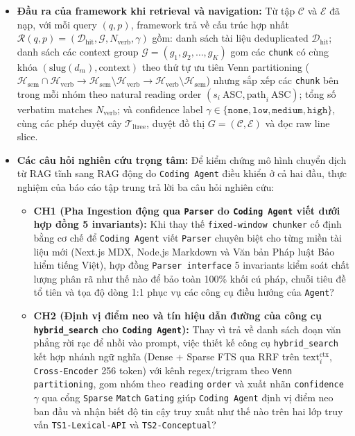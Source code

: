 \begin{itemize}
\begin{enumerate}
        \item \textit{Invariant citation grounding trên graph edge}: Mọi cạnh quan hệ $e = (c_u, c_v, r, \tau) \in \mathcal{E}$ phải thuộc tập 9 mã quan hệ chuẩn của hệ thống, thỏa mãn $c_u \neq c_v$ và chứa chuỗi trích dẫn $\tau \neq \emptyset$ xuất hiện nguyên văn trong $\text{text}^{\text{verb}}_u$ sau khi chuẩn hóa khoảng trắng.
    \end{enumerate}
    \item \textbf{Đầu ra của framework khi retrieval và navigation:}
    Từ tập $\mathcal{C}$ và $\mathcal{E}$ đã nạp, với mỗi query $(q, p)$, framework trả về cấu trúc hợp nhất $\mathcal{R}(q, p) = (\mathcal{D}_{\text{hit}}, \mathcal{G}, N_{\text{verb}}, \gamma)$ gồm: danh sách tài liệu deduplicated $\mathcal{D}_{\text{hit}}$; danh sách các context group $\mathcal{G} = (g_1, g_2, \dots, g_K)$ gom các \texttt{chunk} có cùng khóa $(\text{slug}(d_m), \text{context})$ theo thứ tự ưu tiên Venn partitioning ($\mathcal{H}_{\text{sem}} \cap \mathcal{H}_{\text{verb}} \rightarrow \mathcal{H}_{\text{sem}} \setminus \mathcal{H}_{\text{verb}} \rightarrow \mathcal{H}_{\text{verb}} \setminus \mathcal{H}_{\text{sem}}$) nhưng sắp xếp các \texttt{chunk} bên trong mỗi nhóm theo natural reading order $(s_i\ \text{ASC}, \text{path}_i\ \text{ASC})$; tổng số verbatim matches $N_{\text{verb}}$; và confidence label $\gamma \in \{\texttt{none}, \texttt{low}, \texttt{medium}, \texttt{high}\}$, cùng các phép duyệt cây $\mathcal{T}_{\text{ltree}}$, duyệt đồ thị $G = (\mathcal{C}, \mathcal{E})$ và đọc raw line slice.
    \item \textbf{Các câu hỏi nghiên cứu trọng tâm:} Để kiểm chứng mô hình chuyển dịch từ RAG tĩnh sang RAG động do \texttt{Coding Agent} điều khiển ở cả hai đầu, thực nghiệm của báo cáo tập trung trả lời ba câu hỏi nghiên cứu:
    \begin{itemize}
        \item \textbf{CH1 (Pha Ingestion động qua \texttt{Parser} do \texttt{Coding Agent} viết dưới hợp đồng 5 invariants):} Khi thay thế \texttt{fixed-window chunker} cố định bằng cơ chế để \texttt{Coding Agent} viết \texttt{Parser} chuyên biệt cho từng miền tài liệu mới (Next.js MDX, Node.js Markdown và Văn bản Pháp luật Bảo hiểm tiếng Việt), hợp đồng \texttt{Parser interface} 5 invariants kiểm soát chất lượng phân rã như thế nào để bảo toàn 100\% khối cú pháp, chuỗi tiêu đề tổ tiên và tọa độ dòng 1:1 phục vụ các công cụ điều hướng của \texttt{Agent}?
        \item \textbf{CH2 (Định vị điểm neo và tín hiệu dẫn đường của công cụ \texttt{hybrid\_search} cho \texttt{Coding Agent}):} Thay vì trả về danh sách đoạn văn phẳng rời rạc để nhồi vào prompt, việc thiết kế công cụ \texttt{hybrid\_\allowbreak search} kết hợp nhánh ngữ nghĩa (Dense + Sparse FTS qua RRF trên $\text{text}^{\text{ctx}}_i$, \texttt{Cross-\allowbreak Encoder} 256 token) với kênh regex/trigram theo \texttt{Venn} \texttt{parti\allowbreak tioning}, gom nhóm theo \texttt{reading} \texttt{order} và xuất nhãn \texttt{confidence} $\gamma$ qua cổng \texttt{Sparse} \texttt{Match} \texttt{Gating} giúp \texttt{Coding Agent} định vị điểm neo ban đầu và nhận biết độ tin cậy truy xuất như thế nào trên hai lớp truy vấn \texttt{TS1-Lexical-API} và \texttt{TS2-Conceptual}?

\end{itemize}
\end{itemize}

